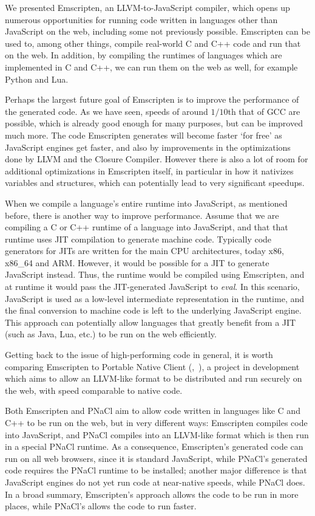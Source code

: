 \documentclass[preprint,10pt]{sigplanconf}
\begin{document}
We presented Emscripten, an LLVM-to-JavaScript compiler, which opens up
numerous opportunities for running code written in languages other
than JavaScript on the web, including some not previously possible.
Emscripten can be used to, among other
things, compile real-world C and C++ code and run that on the web. In
addition, by compiling the runtimes of languages which are implemented in C and C++,
we can run them on the web as well, for example Python and Lua.

Perhaps the largest future goal of Emscripten is to improve the performance of
the generated code. As we have seen, speeds of around $1/10$th that of
GCC are possible, which is already good enough for many purposes, but
can be improved much more. The code Emscripten generates will become faster
`for free' as JavaScript engines get
faster, and also by improvements in the optimizations done by LLVM and the Closure
Compiler. However there is also a lot of room for additional optimizations in
Emscripten itself, in particular in how it nativizes variables and structures,
which can potentially lead to very significant speedups.

When we compile a language's entire runtime into JavaScript, as mentioned
before, there is another way to improve performance.
Assume that we are compiling a C or C++ runtime of a language
into JavaScript, and that that runtime uses JIT compilation to generate machine code. Typically
code generators for JITs are written for the main CPU architectures, today
x86, x86\_64 and ARM. However, it would be possible for a JIT to
generate JavaScript instead. Thus, the runtime would be compiled using
Emscripten, and at runtime it would pass the JIT-generated JavaScript to
\emph{eval}. In this
scenario, JavaScript is used as a low-level intermediate representation in
the runtime, and the final conversion to machine code is left to the underlying
JavaScript engine. This approach can potentially allow languages that 
greatly benefit from a JIT (such as Java, Lua, etc.) to be run on the web
efficiently.

Getting back to the issue of high-performing code in general, it is worth comparing
Emscripten to Portable Native Client (\cite{pnacl},~\cite{nacl}), a project in development which aims
to allow an LLVM-like format to be distributed and run securely
on the web, with speed comparable to native code.

Both Emscripten
and PNaCl aim to allow code written in languages like C and C++ to
be run on the web, but in very different ways: Emscripten compiles code into JavaScript, and
PNaCl compiles into an LLVM-like format which is then
run in a special PNaCl runtime. As a consequence, Emscripten's generated code can run on all web browsers,
since it is standard JavaScript, while PNaCl's generated code
requires the PNaCl runtime to be installed; another major
difference is that JavaScript engines do not yet run code at
near-native speeds, while PNaCl does. In a broad summary, Emscripten's
approach allows the code to be run in more places, while PNaCl's
allows the code to run faster.
\end{document}
